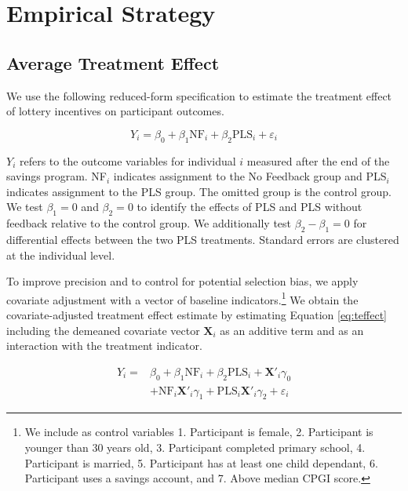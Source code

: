\documentclass[11pt]{article}
\begin{document}
		


		\clearpage

\section{Empirical Strategy} \label{sec:est}

	\subsection{Average Treatment Effect}

		We use the following reduced-form specification to estimate the treatment effect of lottery incentives on participant outcomes.

		\begin{equation} \label{eq:teffect}
			Y_{i} = \beta_{0} + \beta_{1}\text{NF}_{i} + \beta_{2}\text{PLS}_{i} + \varepsilon_{i}
		\end{equation}

		$Y_{i}$ refers to the outcome variables for individual $i$ measured after the end of the savings program. NF$_i$ indicates assignment to the No Feedback group and PLS$_i$ indicates assignment to the PLS group. The omitted group is the control group. We test $\beta_{1} = 0$ and $\beta_{2} = 0$ to identify the effects of PLS and PLS without feedback relative to the control group. We additionally test $\beta_{2} - \beta_{1} = 0$ for differential effects between the two PLS treatments. Standard errors are clustered at the individual level.

		To improve precision and to control for potential selection bias, we apply covariate adjustment with a vector of baseline indicators.\footnote{We include as control variables 1. Participant is female, 2. Participant is younger than 30 years old, 3. Participant completed primary school, 4. Participant is married, 5. Participant has at least one child dependant, 6. Participant uses a savings account, and 7. Above median CPGI score.} We obtain the covariate-adjusted treatment effect estimate by estimating Equation \ref{eq:teffect} including the demeaned covariate vector $\mathbf{X}_{i}$ as an additive term and as an interaction with the treatment indicator.

		\begin{equation} \begin{split} \label{eq:controls}
			Y_{i} = & \beta_{0} + \beta_{1}\text{NF}_{i} + \beta_{2}\text{PLS}_{i} + \mathbf{X}'_i \gamma_{0} \\
					& + \text{NF}_{i} \mathbf{X}'_i \gamma_{1} + \text{PLS}_{i} \mathbf{X}'_i \gamma_{2} + \varepsilon_{i}
		\end{split} \end{equation}
\end{document}
